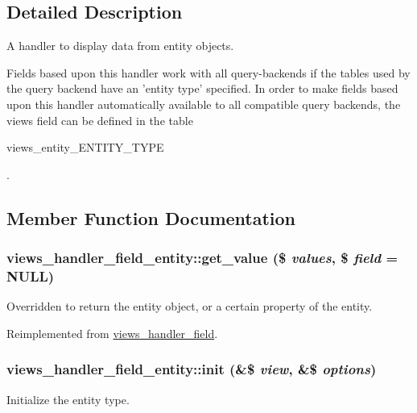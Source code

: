 \subsection{Detailed Description}
A handler to display data from entity objects.

Fields based upon this handler work with all query-\/backends if the tables used by the query backend have an 'entity type' specified. In order to make fields based upon this handler automatically available to all compatible query backends, the views field can be defined in the table 
\begin{DoxyCode}
 views_entity_{ENTITY_TYPE} 
\end{DoxyCode}
. 

\subsection{Member Function Documentation}
\hypertarget{classviews__handler__field__entity_a79bd099a54975a492106311242054ccb}{
\subsubsection[{get\_\-value}]{\setlength{\rightskip}{0pt plus 5cm}views\_\-handler\_\-field\_\-entity::get\_\-value (\$ {\em values}, \/  \$ {\em field} = {\ttfamily NULL})}}
\label{classviews__handler__field__entity_a79bd099a54975a492106311242054ccb}
Overridden to return the entity object, or a certain property of the entity. 

Reimplemented from \hyperlink{classviews__handler__field_a293517c0221b4c11e5c353e518a271c4}{views\_\-handler\_\-field}.\hypertarget{classviews__handler__field__entity_abf4b21db5fffaa1ddfdaca4896a40832}{
\subsubsection[{init}]{\setlength{\rightskip}{0pt plus 5cm}views\_\-handler\_\-field\_\-entity::init (\&\$ {\em view}, \/  \&\$ {\em options})}}
\label{classviews__handler__field__entity_abf4b21db5fffaa1ddfdaca4896a40832}
Initialize the entity type. 


